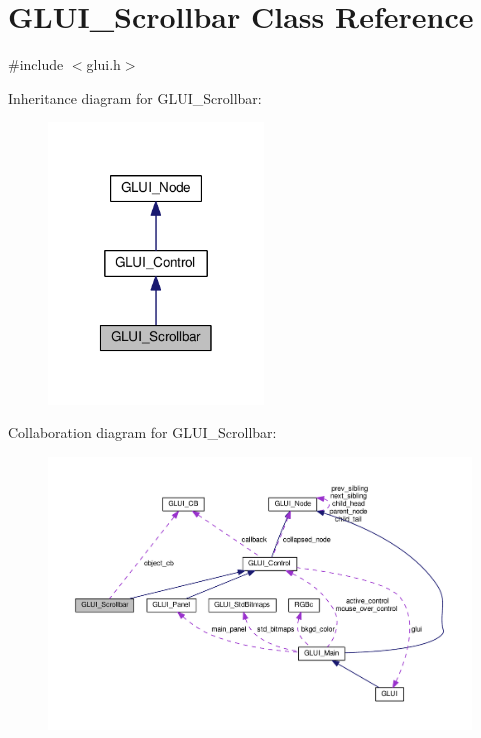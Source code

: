 \hypertarget{class_g_l_u_i___scrollbar}{\section{G\+L\+U\+I\+\_\+\+Scrollbar Class Reference}
\label{class_g_l_u_i___scrollbar}
}


{\ttfamily \#include $<$glui.\+h$>$}



Inheritance diagram for G\+L\+U\+I\+\_\+\+Scrollbar\+:\nopagebreak
\begin{figure}[H]
\begin{center}
\leavevmode
\includegraphics[width=162pt]{class_g_l_u_i___scrollbar__inherit__graph}
\end{center}
\end{figure}


Collaboration diagram for G\+L\+U\+I\+\_\+\+Scrollbar\+:\nopagebreak
\begin{figure}[H]
\begin{center}
\leavevmode
\includegraphics[width=350pt]{class_g_l_u_i___scrollbar__coll__graph}
\end{center}
\end{figure}
